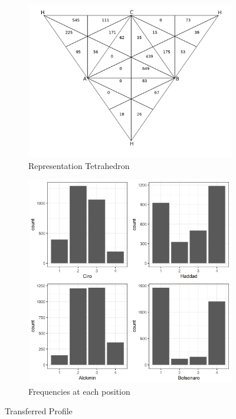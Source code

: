 \documentclass[hidelinks,11pt]{article}
\begin{document}
\begin{figure}[H]
  \centering
  \begin{subfigure}[b]{0.49\textwidth}
    \centering
\includegraphics[width=\textwidth]{./images/representation_tetrahedron.png}
 \caption{Representation Tetrahedron}
 \label{fig:rep_ot}
\end{subfigure}
  \hfill
  \begin{subfigure}[b]{0.49\textwidth}
    \centering
\includegraphics[width=\textwidth]{./images/corrected1_indexes_plot.png}
 \caption{Frequencies at each position}
 \label{fig:counts}
\end{subfigure}
\caption{Transferred Profile}
\label{fig:profile_trans}
\end{figure}
\end{document}
